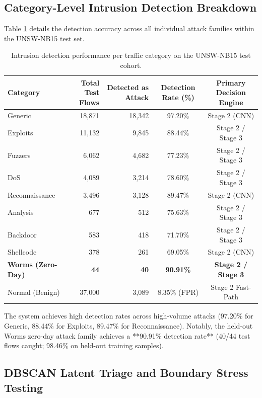 \documentclass[preprint,12pt]{elsarticle}
\begin{document}
\subsection{Category-Level Intrusion Detection Breakdown}
Table \ref{tab:category_breakdown} details the detection accuracy across all individual attack families within the UNSW-NB15 test set.

\begin{table}[t]
\centering
\caption{Intrusion detection performance per traffic category on the UNSW-NB15 test cohort.}
\label{tab:category_breakdown}
\small
\begin{tabular}{lrrcc}
\toprule
\textbf{Category} & \textbf{Total Test Flows} & \textbf{Detected as Attack} & \textbf{Detection Rate (\%)} & \textbf{Primary Decision Engine} \\
\midrule
Generic        & 18,871 & 18,342 & 97.20\% & Stage 2 (CNN) \\
Exploits       & 11,132 & 9,845  & 88.44\% & Stage 2 / Stage 3 \\
Fuzzers        & 6,062  & 4,682  & 77.23\% & Stage 2 / Stage 3 \\
DoS            & 4,089  & 3,214  & 78.60\% & Stage 2 / Stage 3 \\
Reconnaissance & 3,496  & 3,128  & 89.47\% & Stage 2 (CNN) \\
Analysis       & 677    & 512    & 75.63\% & Stage 2 / Stage 3 \\
Backdoor       & 583    & 418    & 71.70\% & Stage 2 / Stage 3 \\
Shellcode      & 378    & 261    & 69.05\% & Stage 2 (CNN) \\
\midrule
\textbf{Worms (Zero-Day)} & \textbf{44} & \textbf{40} & \textbf{90.91\%} & \textbf{Stage 2 / Stage 3} \\
\midrule
Normal (Benign) & 37,000 & 3,089 & 8.35\% (FPR) & Stage 2 Fast-Path \\
\bottomrule
\end{tabular}
\end{table}

The system achieves high detection rates across high-volume attacks (97.20\% for Generic, 88.44\% for Exploits, 89.47\% for Reconnaissance). Notably, the held-out Worms zero-day attack family achieves a **90.91\% detection rate** (40/44 test flows caught; 98.46\% on held-out training samples).

\subsection{DBSCAN Latent Triage and Boundary Stress Testing}
\end{document}
